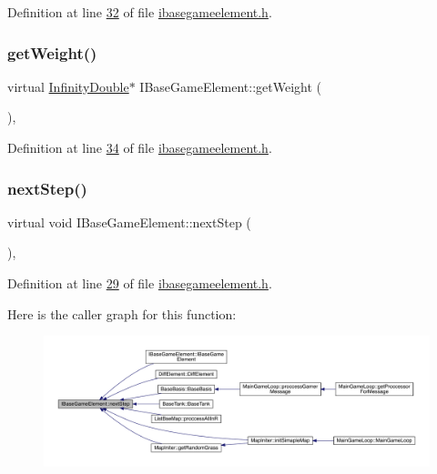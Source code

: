 Definition at line \hyperlink{a00047_source_l00032}{32} of file \hyperlink{a00047_source}{ibasegameelement.\+h}.

\mbox{\label{a00137_a935a07134430bbb44c3214629d607a3d}} 
\subsubsection{\texorpdfstring{get\+Weight()}{getWeight()}}
{\footnotesize\ttfamily virtual \hyperlink{a00161}{Infinity\+Double}$\ast$ I\+Base\+Game\+Element\+::get\+Weight (\begin{DoxyParamCaption}{ }\end{DoxyParamCaption})\hspace{0.3cm}{\ttfamily [inline]}, {\ttfamily [virtual]}}



Definition at line \hyperlink{a00047_source_l00034}{34} of file \hyperlink{a00047_source}{ibasegameelement.\+h}.

\mbox{\label{a00137_ae2be75da1a2a9edfabe993770e24654a}} 
\subsubsection{\texorpdfstring{next\+Step()}{nextStep()}}
{\footnotesize\ttfamily virtual void I\+Base\+Game\+Element\+::next\+Step (\begin{DoxyParamCaption}{ }\end{DoxyParamCaption})\hspace{0.3cm}{\ttfamily [inline]}, {\ttfamily [virtual]}}



Definition at line \hyperlink{a00047_source_l00029}{29} of file \hyperlink{a00047_source}{ibasegameelement.\+h}.

Here is the caller graph for this function\+:
\nopagebreak
\begin{figure}[H]
\begin{center}
\leavevmode
\includegraphics[width=350pt]{d2/df5/a00137_ae2be75da1a2a9edfabe993770e24654a_icgraph}
\end{center}
\end{figure}
\mbox{\label{a00137_a71d8528482d5be16100ad56dbfd4aae9}} 
